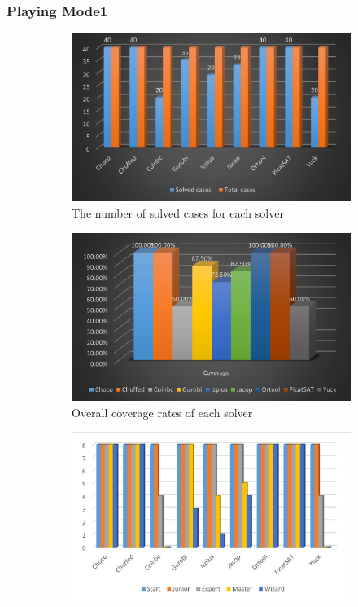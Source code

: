 \subsubsection{Playing Mode1}
\begin{figure}[htbp]
    \centering
    \begin{subfigure}[b]{0.48\textwidth}
    \centering
    \includegraphics[width=\textwidth]{figs/mode1solvedcases.png}
    \caption{The number of solved cases for each solver}
    \label{fig:mode1eva1}
    \end{subfigure}
     \begin{subfigure}[b]{0.48\textwidth}
     \centering
    \includegraphics[width=\textwidth]{figs/mode1coverage.png}
    \caption{Overall coverage rates of each solver}
    \label{fig:mode1eva2}
    \end{subfigure}
     \begin{subfigure}[b]{0.48\textwidth}
    \includegraphics[width=\textwidth]{figs/mode1seperatedcases.png}

\end{subfigure}
\end{figure}
